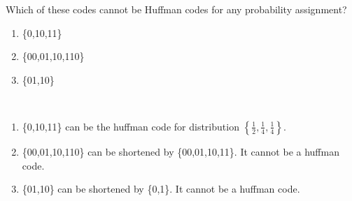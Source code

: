 \begin{exercise}{ Which of these codes cannot be Huffman codes for any probability assignment?
  \begin{enumerate}
    \item \{0,10,11\}
    \item \{00,01,10,110\}
    \item \{01,10\}
  \end{enumerate}
  }
  \begin{solution}
  \par{~}
  \begin{enumerate}
    \item { \{0,10,11\} can be the huffman code for distribution $\left\{\frac{1}{2},\frac{1}{4},\frac{1}{4}\right\}$.
    }
    \item { \{00,01,10,110\} can be shortened by \{00,01,10,11\}. It cannot be a huffman code. 

    }
    \item { \{01,10\} can be shortened by \{0,1\}. It cannot be a huffman code.

    }
  \end{enumerate}
  \end{solution}
  \label{ex5}
\end{exercise}


